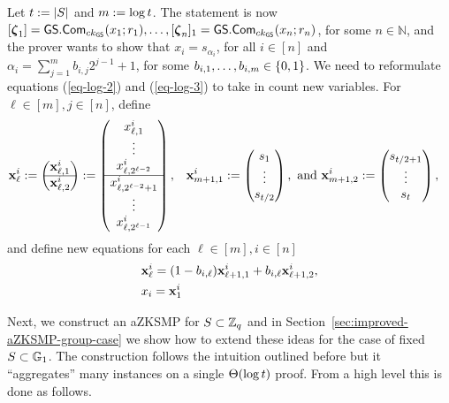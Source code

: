 Let $t:=|S|$ and \(m:=\log t \). The statement is now \([{\boldsymbol \zeta}_1]={\mathsf{GS}}.\mathsf{Com}_{ck_{\mathsf{GS}}}(x_1;r_1),\ldots,\allowbreak[{\boldsymbol \zeta}_n]_1={\mathsf{GS}}.\mathsf{Com}_{ck_{\mathsf{GS}}}(x_n;r_n)\), for some $n\in\mathbb{N}$, and the prover wants to show that \(x_i=s_{\alpha_i}\), for all \(i\in[n]\) and \(\alpha_i=\sum_{j=1}^m b_{i,j}2^{j-1}+1\), for some $b_{i,1},\ldots,b_{i,m}\in\{0,1\}$. We need to reformulate equations (\ref{eq-log-2}) and (\ref{eq-log-3}) to take in count new variables. For \(\ell\in [m],j\in[n]\), define
\begin{align*}
&\mathbf{x}_\ell^i:=
\begin{pmatrix}
\mathbf{x}^i_{\ell,1}\\
\hline
\mathbf{x}^i_{\ell,2}
\end{pmatrix}
:=
\begin{pmatrix}
x^i_{\ell,1}\\\vdots\\x^i_{\ell,2^{\ell-2}}\\
\hline
x^i_{\ell,2^{\ell-2}+1}\\\vdots\\x^i_{\ell,2^{\ell-1}}
\end{pmatrix},
&\mathbf{x}^i_{m+1,1} := \begin{pmatrix}
s_1\\\vdots\\s_{t/2}
\end{pmatrix},\text{ and }
&\mathbf{x}^i_{m+1,2} := \begin{pmatrix}
s_{t/2+1}\\\vdots\\s_{t }
\end{pmatrix},
\end{align*}
and define new equations for each $\ell\in[m],i\in[n]$
\begin{align}
&\mathbf{x}^i_\ell=({1}-{b}_{i,\ell})\mathbf{x}^i_{\ell+1,1}+{b}_{i,\ell}\mathbf{x}^i_{\ell+1,2},\label{eq-alog-1}\\
&x_i= \mathbf{x}^{i}_1\label{eq-alog-2}
\end{align}

Next, we construct an aZKSMP for $S\subset\mathbb{Z}_q$ and in Section~\ref{sec:improved-aZKSMP-group-case} we show how to extend these ideas for the case of fixed \(S\subset\mathbb{G}_1\).
The construction follows the intuition outlined before but it ``aggregates'' many instances on a single \(\Theta(\log t )\) proof. From a high level this is done as follows.

